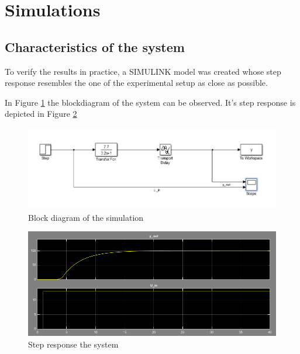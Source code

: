 \section{Simulations}

\subsection{Characteristics of the system}

To verify the results in practice, a SIMULINK model was created whose step response resembles the one of the experimental setup as close as possible.

In Figure \ref{fig:block_dia_simu} the blockdiagram of the system can be observed. It's step response is depicted in Figure \ref{fig:step_resp_simu}

\begin{figure}[H]
\begin{center}
\includegraphics[width=1\linewidth]{images/general/block_dia_simu}
\end{center}
\caption{Block diagram of the simulation}
\label{fig:block_dia_simu}
\end{figure}

\begin{figure}[H]
\begin{center}
\includegraphics[width=1\linewidth]{images/general/step_resp_simu}
\end{center}
\caption{Step response the system}
\label{fig:step_resp_simu}
\end{figure}

